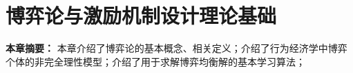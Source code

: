 \chapter{博弈论与激励机制设计理论基础}

\textbf{本章摘要：} 
本章介绍了博弈论的基本概念、相关定义；介绍了行为经济学中博弈个体的非完全理性模型；介绍了用于求解博弈均衡解的基本学习算法；



